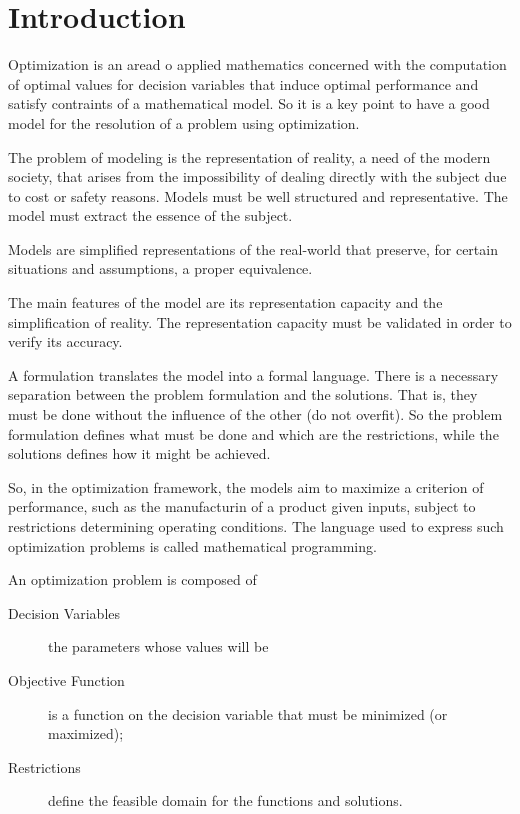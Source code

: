 
\section*{Introduction}

Optimization is an aread o applied mathematics concerned with the computation of optimal values for decision variables that induce optimal performance and satisfy contraints of a mathematical model. So it is a key point to have a good model for the resolution of a problem using optimization.

The problem of modeling is the representation of reality, a need of the modern society, that arises from the impossibility of dealing directly with the subject due to cost or safety reasons. Models must be well structured and representative. The model must extract the essence of the subject.

\begin{definition}
    Models are simplified representations of the real-world that preserve, for certain situations and assumptions, a proper equivalence.
\end{definition}

The main features of the model are its representation capacity and the simplification of reality. The representation capacity must be validated in order to verify its accuracy.

A formulation translates the model into a formal language. There is a necessary separation between the problem formulation and the solutions. That is, they must be done without the influence of the other (do not overfit). So the problem formulation defines what must be done and which are the restrictions, while the solutions defines how it might be achieved.

So, in the optimization framework, the models aim to maximize a criterion of performance, such as the manufacturin of a product given inputs, subject to restrictions determining operating conditions. The language used to express such optimization problems is called mathematical programming.

An optimization problem is composed of
\begin{description}
    \item[Decision Variables] the parameters whose values will be \\
    \item[Objective Function] is a function on the decision variable that must be minimized (or maximized); \\
    \item[Restrictions] define the feasible domain for the functions and solutions.
\end{description}

